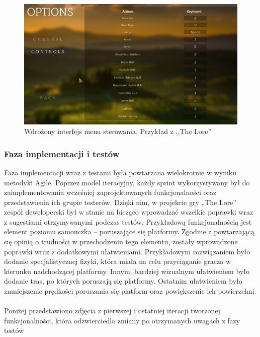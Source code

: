 \documentclass[oneside,polski,logo]{amuthesis}
\begin{document}
\begin{figure}[h]
	\centering
	\includegraphics[width=14cm]{images/hyps/of2.png}
	\caption{Wdrożony interfejs menu sterowania. Przykład z ,,The Lore''}
\end{figure}

\subsubsection{Faza implementacji i testów}

Faza implementacji wraz z testami była powtarzana wielokrotnie w wyniku metodyki Agile. Poprzez model iteracyjny, każdy sprint wykorzystywany był do zaimplementowania wcześniej zaprojektowanych funkcjonalności oraz przedstawienia ich grupie testerów. Dzięki nim, w projekcie gry „The Lore” zespół deweloperski był w stanie na bieżąco wprowadzać wszelkie poprawki wraz z sugestiami otrzymywanymi podczas testów. Przykładową funkcjonalnością jest element poziomu samouczka – poruszające się platformy. Zgodnie z powtarzającą się opinią o trudności w przechodzeniu tego elementu, zostały wprowadzone poprawki wraz z dodatkowymi ułatwieniami. Przykładowym rozwiązaniem było dodanie specjalistycznej fizyki, która miała na celu przyciąganie gracza w kierunku nadchodzącej platformy. Innym, bardziej wizualnym ułatwieniem było dodanie tras, po których poruszają się platformy. Ostatnim ułatwieniem było zmniejszenie prędkości poruszania się platform oraz powiększenie ich powierzchni. \\ \\ 
Poniżej przedstawiono zdjęcia z pierwszej i ostatniej iteracji tworzonej funkcjonalności, która odzwierciedla zmiany po otrzymanych uwagach z fazy testów\\ \\ \\
\end{document}

